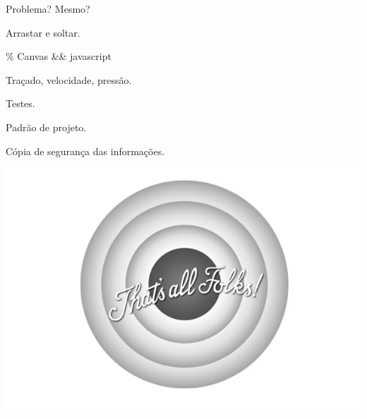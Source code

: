 \documentclass[xcolor=dvipsnames]{beamer}
\begin{document}
  \begin{frame}
    \begin{center}
      \Huge Problema? Mesmo?
    \end{center}
  \end{frame}

  \begin{frame}
    \begin{center}
      \Large Arrastar e soltar.

      \vspace{1cm}

      \LARGE {\rmfamily \%} Canvas {\rmfamily \&\&} javascript

      \vspace{1cm}

      \Large Traçado, velocidade, pressão.
    \end{center}
  \end{frame}

  \begin{frame}
    \begin{center}
      \Large Testes.

      \vspace{1cm}

      \LARGE Padrão de projeto.

      \vspace{1cm}

      \Large Cópia de segurança das informações.
    \end{center}
  \end{frame}

  \begin{frame}
    \begin{center}
      \includegraphics[width=\textwidth, height=\textheight]{images/013-stefan-asafti-marcas-cartoon-isso-e-tudo}
    \end{center}
  \end{frame}
\end{document}
